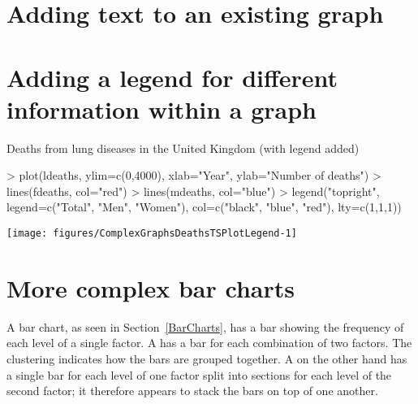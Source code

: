 \section{Adding text to an existing graph}


\section{Adding a legend for different information within a graph}

\begin{exhibit}
\begin{center}
\caption{Deaths from lung diseases in the United Kingdom (with legend added)}
\label{LungsLegend}
\begin{Schunk}
\begin{Sinput}
> plot(ldeaths, ylim=c(0,4000), xlab="Year", ylab="Number of deaths")
> lines(fdeaths, col="red")
> lines(mdeaths, col="blue")
> legend("topright", legend=c("Total", "Men", "Women"), col=c("black", "blue", "red"), lty=c(1,1,1))
\end{Sinput}

\texttt{[image: figures/ComplexGraphsDeathsTSPlotLegend-1]} \end{Schunk}
\end{center}
\end{exhibit}

\section{More complex bar charts}

A bar chart, as seen in Section~\ref{BarCharts}, has a bar showing the frequency of each level of a single factor. A  has a bar for each combination of two factors. The clustering indicates how the bars are grouped together. A  on the other hand has a single bar for each level of one factor split into sections for each level of the second factor; it therefore appears to stack the bars on top of one another.

